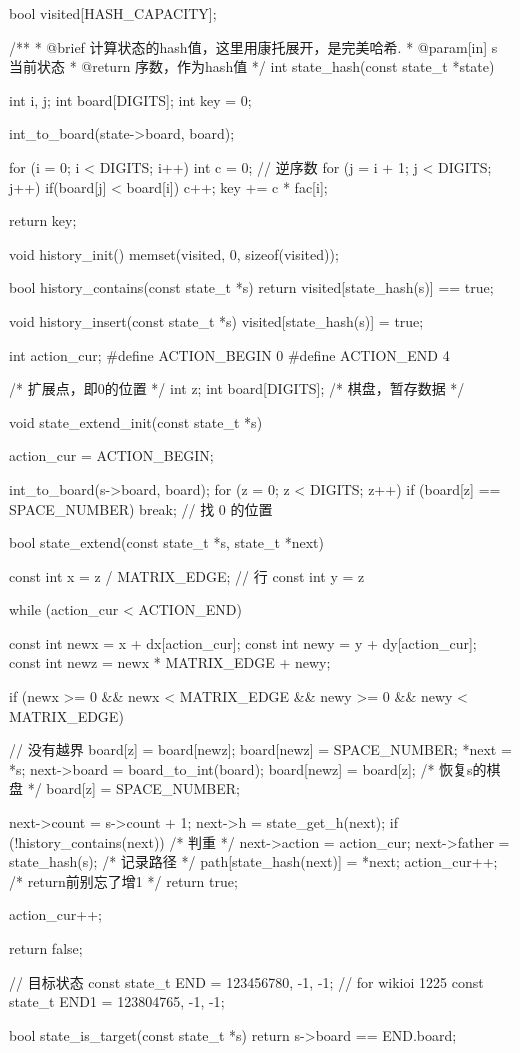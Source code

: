 \begin{Codex}[label=eight_digits_astar.c]
bool visited[HASH_CAPACITY];

/**
 * @brief 计算状态的hash值，这里用康托展开，是完美哈希.
 * @param[in] s 当前状态
 * @return 序数，作为hash值
 */
int state_hash(const state_t *state) {
    int i, j;
    int board[DIGITS];
    int key = 0;

    int_to_board(state->board, board);

    for (i = 0; i < DIGITS; i++) {
        int c = 0; // 逆序数
        for (j = i + 1; j < DIGITS; j++) {
            if(board[j] < board[i]) {
                c++;
            }
        }
        key += c * fac[i];
    }

    return key;
}

void history_init() {
    memset(visited, 0, sizeof(visited));
}

bool history_contains(const state_t *s) {
    return visited[state_hash(s)] == true;
}

void history_insert(const state_t *s) {
    visited[state_hash(s)] = true;
}

int action_cur;
#define ACTION_BEGIN 0
#define ACTION_END 4

/* 扩展点，即0的位置 */
int z;
int board[DIGITS];  /* 棋盘，暂存数据 */

void state_extend_init(const state_t *s) {
    action_cur = ACTION_BEGIN;

    int_to_board(s->board, board);
    for (z = 0; z < DIGITS; z++) {
        if (board[z] == SPACE_NUMBER) {
            break;  // 找 0 的位置
        }
    }
}

bool state_extend(const state_t *s, state_t *next) {
    const int x = z / MATRIX_EDGE; // 行
    const int y = z %

    while (action_cur < ACTION_END) {
        const int newx = x + dx[action_cur];
        const int newy = y + dy[action_cur];
        const int newz = newx * MATRIX_EDGE + newy;

        if (newx >= 0 && newx < MATRIX_EDGE && newy >= 0 &&
                newy < MATRIX_EDGE) { // 没有越界
            board[z] = board[newz];
            board[newz] = SPACE_NUMBER;
            *next = *s;
            next->board = board_to_int(board);
            board[newz] = board[z]; /* 恢复s的棋盘 */
            board[z] = SPACE_NUMBER;

            next->count = s->count + 1;
            next->h = state_get_h(next);
            if (!history_contains(next)) { /* 判重 */
                next->action = action_cur;
                next->father = state_hash(s);
                /* 记录路径 */
                path[state_hash(next)] = *next;
                action_cur++; /* return前别忘了增1 */
                return true;
            }
        }
        action_cur++;
    }
    return false;
}

// 目标状态
const state_t END = {123456780, -1, -1};
// for wikioi 1225
const state_t END1 = {123804765, -1, -1};

bool state_is_target(const state_t *s) {
    return s->board == END.board;
}
\end{Codex}
